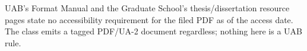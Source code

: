 %
%
\thesissetchapteropening{2in}



%
	{UAB's Format Manual and the Graduate School's thesis/dissertation resource
	 pages state no accessibility requirement for the filed PDF as of the access
	 date. The class emits a tagged PDF/UA-2 document regardless; nothing here
	 is a UAB rule.}

